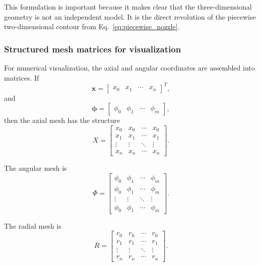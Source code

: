 \documentclass[11pt,a4paper]{article}
\begin{document}
This formulation is important because it makes clear that the three-dimensional geometry is not an independent model. It is the direct revolution of the piecewise two-dimensional contour from Eq.~\eqref{eq:piecewise_nozzle}.

\subsubsection{Structured mesh matrices for visualization}

For numerical visualization, the axial and angular coordinates are assembled into matrices. If
\begin{equation}
\bm{x}=\begin{bmatrix}x_0&x_1&\cdots&x_n\end{bmatrix}^T,
\end{equation}
and
\begin{equation}
\bm{\phi}=\begin{bmatrix}\phi_0&\phi_1&\cdots&\phi_m\end{bmatrix},
\end{equation}
then the axial mesh has the structure
\begin{equation}
X=\begin{bmatrix}
x_0&x_0&\cdots&x_0\\
x_1&x_1&\cdots&x_1\\
\vdots&\vdots&\ddots&\vdots\\
x_n&x_n&\cdots&x_n
\end{bmatrix}.
\label{eq:Xmesh}
\end{equation}

The angular mesh is
\begin{equation}
\Phi=\begin{bmatrix}
\phi_0&\phi_1&\cdots&\phi_m\\
\phi_0&\phi_1&\cdots&\phi_m\\
\vdots&\vdots&\ddots&\vdots\\
\phi_0&\phi_1&\cdots&\phi_m
\end{bmatrix}.
\label{eq:Phimesh}
\end{equation}

The radial mesh is
\begin{equation}
R=\begin{bmatrix}
r_0&r_0&\cdots&r_0\\
r_1&r_1&\cdots&r_1\\
\vdots&\vdots&\ddots&\vdots\\
r_n&r_n&\cdots&r_n
\end{bmatrix}.
\label{eq:Rmesh}
\end{equation}
\end{document}
